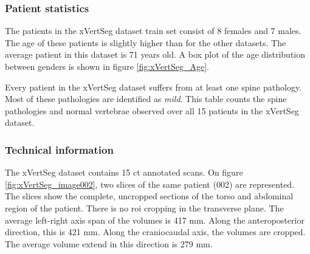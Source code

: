 \subsubsection{Patient statistics}

The patients in the xVertSeg dataset train set consist of 8 females and 7 males.
The age of these patients is slightly higher than for the other datasets.
The average patient in this dataset is 71 years old.
A box plot of the age distribution between genders is shown in figure \ref{fig:xVertSeg_Age}. 

\begin{table}
    \centering
        
        \caption{Every patient in the xVertSeg dataset suffers from at least one spine pathology.
        Most of these pathologies are identified as \textit{mild}.
        This table counts the spine pathologies and normal vertebrae observed over all 15 patients in the xVertSeg dataset.}   
\end{table}


\subsubsection{Technical information}

The xVertSeg dataset contains 15 \acrshort{ct} annotated scans. 
On figure \ref{fig:xVertSeg_image002}, two slices of the same patient (002) are represented.
The slices show the complete, uncropped sections of the torso and abdominal region of the patient. 
There is no \acrshort{roi} cropping in the transverse plane.
The average left-right axis span of the volumes is 417 mm. Along the anteroposterior direction, this is 421 mm. 
Along the craniocaudal axis, the volumes are cropped. The average volume extend in this direction is 279 mm.

